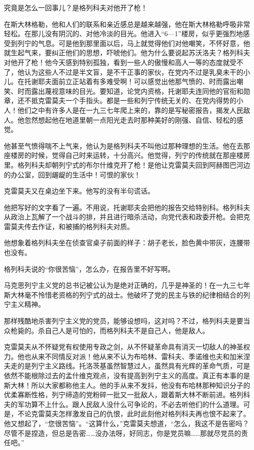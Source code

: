 究竟是怎么一回事儿？是格列科夫对他开了枪！

在斯大林格勒，他和人们的联系和亲近感总是越来越强，他在斯大林格勒呼吸非常轻松。在那儿没有阴沉的、对他冷淡的目光。他进入“6—1”楼房，似乎更强烈地感受到列宁的气息。可是他到那里面以后，马上就觉得他们对他嘲笑，不怀好意，他就生起气来，要纠正他们的思想，吓唬他们。他为什么要说起苏沃洛夫？格列科夫对他开了枪！他今天感到特别孤独，看到一些人的傲慢和高人一等的态度就受不了，他认为这些人不过是半文盲，是不干正事的家伙，在党内不过是乳臭未干的小儿。在托谢耶夫面前立正站着有多难受啊！可以感觉出他那气愤的、时而露出嘲笑、时而露出蔑视意味的目光。要知道，论党内资格，托谢耶夫连同他的官衔和勋章，还不抵克雷莫夫一个手指头。都是一些和列宁传统无关的、在党内得势的小人！他们之中有许多人是在一九三七年爬上来的，靠的是写秘密报告，揭发人民敌人。他忽然想起他在地道里朝一点阳光走去时那种美好的刚强、自信、轻松的感觉。

他甚至气愤得喘不上气来，他认为是格列科夫不叫他过那种理想的生活。他在去那座楼房的时候，觉得自己时来运转，十分高兴。他觉得，列宁的传统就在那座楼房里。格列科夫却朝列宁式的布尔什维克开了枪！是他让克雷莫夫回到阿赫图巴河边的办公室，回到龌龊的生活中！可恨的家伙！

克雷莫夫又在桌边坐下来。他写的没有半句谎话。

他把写好的文字看了一遍。不用说，托谢耶夫会把他的报告交给特别科。格列科夫从政治上瓦解了一个战斗的排，并且进行暗杀活动，向党代表和政委开枪。会把克雷莫夫传去作证，和被捕的格列科夫对质。

他想象着格列科夫坐在侦查官桌子前面的样子：胡子老长，脸色黄中带灰，连腰带也没有。

格列科夫说的“你很苦恼”，怎么办，在报告里不好写啊。

马克思列宁主义党的总书记被公认为是绝对正确的，几乎是神圣的！在一九三七年斯大林毫不怜惜老资格的列宁式的战士。他破坏了党的民主与铁的纪律相结合的列宁主义精神。

那样残酷地杀害列宁主义党的党员，能够设想吗，这对吗？不过，格列科夫是要当众枪毙的。杀自己人是可怕的，而格列科夫不是自己人，他是敌人。

克雷莫夫从不怀疑党有权使用专政之剑，从不怀疑革命具有消灭一切敌人的神圣权力。他也从来不同情反对派！他从来不认为布哈林、雷科夫、季诺维也夫和加米涅夫走的是列宁主义路线。托洛茨基虽然智慧过人，虽然具有光辉的革命气质，可是依然不能根除过去的孟什维克观点，没有提高到列宁主义的高度。真正有本事的是斯大林！所以大家都称他主人。他的手从来不发抖，他没有布哈林那种知识分子的优柔寡断性格，列宁缔造的党粉碎一批又一批敌人，跟着斯大林不断前进。格列科夫的军功算不上什么。跟人民敌人没什么可争论的，不必去听他们的什么道理。可是，不论克雷莫夫怎样激发自己的仇恨，此时此刻他对格列科夫再也恨不起来了。他又想起了，“您很苦恼”。“这算什么，”克雷莫夫想道，“怎么，我这不是告密吗？尽管不是捏造，但总是告密……没办法呀，好同志，你是党员嘛……那就尽党员的责任吧。”

